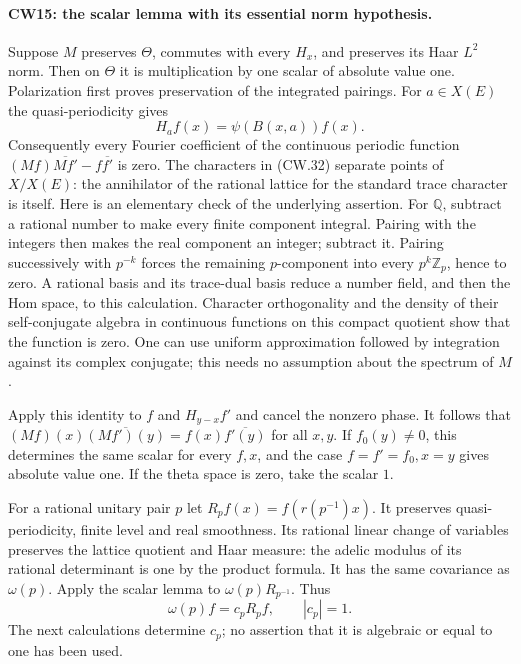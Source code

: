\paragraph{CW15: the scalar lemma with its essential norm hypothesis.}
Suppose $M$ preserves $\Theta$, commutes with every $H_x$, and
preserves its Haar $L^2$ norm.  Then on $\Theta$ it is multiplication
by one scalar of absolute value one.  Polarization first proves
preservation of the integrated pairings.  For $a\in X(E)$ the
quasi-periodicity gives
\[
                    H_af(x)=\psi(B(x,a))f(x).           \tag{CW.32}
\]
Consequently every Fourier coefficient of the continuous periodic
function $(Mf)\overline{Mf'}-f\overline{f'}$ is zero.
The characters in (CW.32) separate points of $X/X(E)$: the
annihilator of the rational lattice for the standard trace character
is itself.  Here is an elementary check of the underlying assertion.
For $\mathbb Q$, subtract a rational number to make every finite
component integral.  Pairing with the integers then makes the real
component an integer; subtract it.  Pairing successively with
$p^{-k}$ forces the remaining $p$-component into every $p^k\mathbb Z_p$,
hence to zero.  A rational basis and its trace-dual basis reduce a
number field, and then the Hom space, to this calculation.
Character orthogonality and the density of their
self-conjugate algebra in continuous functions on this compact
quotient show that the function is zero.  One can use uniform
approximation followed by integration against its complex conjugate;
this needs no assumption about the spectrum of $M$.

Apply this identity to $f$ and $H_{y-x}f'$ and cancel the nonzero
phase.  It follows that
$(Mf)(x)\overline{(Mf')(y)}=f(x)\overline{f'(y)}$ for all $x,y$.
If $f_0(y)\ne0$, this determines the same scalar for every $f,x$,
and the case $f=f'=f_0,x=y$ gives absolute value one.  If the theta
space is zero, take the scalar $1$.

For a rational unitary pair $p$ let
$R_pf(x)=f(r(p^{-1})x)$.  It preserves quasi-periodicity, finite
level and real smoothness.  Its rational linear change of variables
preserves the lattice quotient and Haar measure: the adelic
modulus of its rational determinant is one by the product formula.
It has the same covariance as $\omega(p)$.  Apply the scalar lemma
to $\omega(p)R_{p^{-1}}$.  Thus
\[
                     \omega(p)f=c_pR_pf,
                              \qquad |c_p|=1.          \tag{CW.33}
\]
The next calculations determine $c_p$; no assertion that it is
algebraic or equal to one has been used.

